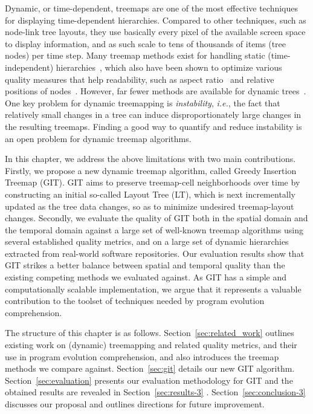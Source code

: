 Dynamic, or time-dependent, treemaps are one of the most effective techniques for displaying time-dependent hierarchies. Compared to other techniques, such as node-link tree layouts, they use basically every pixel of the available screen space to display information, and as such scale to tens of thousands of items (tree nodes) per time step. Many treemap methods exist for handling static (time-independent) hierarchies~\citep{shneiderman92,sqr}, which also have been shown to optimize various quality measures that help readability, such as aspect ratio~\citep{sqr, nagamochi07} and relative positions of nodes~\citep{sot,ordered,Ghoniem2015, Buchin2011,nmap}. However, far fewer methods are available for dynamic trees~\citep{hahn10,sondag17,htm}. One key problem for dynamic treemapping is \emph{instability}, \emph{i.e.}, the fact that relatively small changes in a tree can induce disproportionately large changes in the resulting treemaps. Finding a good way to quantify and reduce instability is an open problem for dynamic treemap algorithms.

In this chapter, we address the above limitations with two main contributions. Firstly, we propose a new dynamic treemap algorithm, called Greedy Insertion Treemap (GIT). GIT aims to preserve treemap-cell neighborhoods over time by constructing an initial so-called Layout Tree (LT), which is next incrementally updated as the tree data changes, so as to minimize undesired treemap-layout changes.
Secondly, we evaluate the quality of GIT both in the spatial domain and the temporal domain against a large set of well-known treemap algorithms using several established quality metrics, and on a large set of dynamic hierarchies extracted from real-world software repositories. Our evaluation results show that GIT strikes a better balance between spatial and temporal quality than the existing competing methods we evaluated against. As GIT has a simple and computationally scalable implementation, we argue that it represents a valuable contribution to the toolset of techniques needed by program evolution comprehension.

The structure of this chapter is as follows. Section~\ref{sec:related_work} outlines existing work on (dynamic) treemapping and related quality metrics, and their use in program evolution comprehension, and also introduces the treemap methods we compare against. Section~\ref{sec:git} details our new GIT algorithm. Section~\ref{sec:evaluation} presents our evaluation methodology for GIT and the obtained results are revealed in Section~\ref{sec:results-3} . Section~\ref{sec:conclusion-3} discusses our proposal and outlines directions for future improvement.


